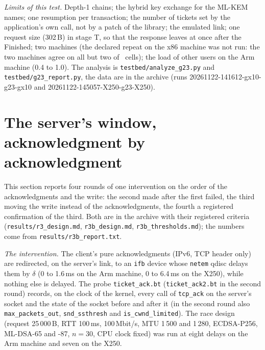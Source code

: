 \documentclass[9pt]{article}
\begin{document}
\emph{Limits of this test.} Depth-1 chains; the hybrid key exchange for the ML-KEM names; one resumption per transaction; the number of tickets set by the application's own call, not by a patch of the library; the emulated link; one request size (302\,B) in stage T, so that the response leaves at once after the Finished; two machines (the declared repeat on the x86 machine was not run: the two machines agree on all but two of \GtlsBothCells\ cells); the load of other users on the Arm machine (0.4 to 1.0). The analysis is \texttt{testbed/analyze\_g23.py} and \texttt{testbed/g23\_report.py}, the data are in the archive (runs 20261122-141612-gx10-g23-gx10 and 20261122-145057-X250-g23-X250).

\section*{The server's window, acknowledgment by acknowledgment}
This section reports four rounds of one intervention on the order of the acknowledgments and the write: the second made after the first failed, the third moving the write instead of the acknowledgments, the fourth a registered confirmation of the third. Both are in the archive with their registered criteria (\texttt{results/r3\_design.md}, \texttt{r3b\_design.md}, \texttt{r3b\_thresholds.md}); the numbers come from \texttt{results/r3b\_report.txt}.

\emph{The intervention.} The client's pure acknowledgments (IPv6, TCP header only) are redirected, on the server's link, to an \texttt{ifb} device whose \texttt{netem} qdisc delays them by $\delta$ (0 to 1.6\,ms on the Arm machine, 0 to 6.4\,ms on the X250), while nothing else is delayed. The probe \texttt{ticket\_ack.bt} (\texttt{ticket\_ack2.bt} in the second round) records, on the clock of the kernel, every call of \texttt{tcp\_ack} on the server's socket and the state of the socket before and after it (in the second round also \texttt{max\_packets\_out}, \texttt{snd\_ssthresh} and \texttt{is\_cwnd\_limited}). The race design (request 25\,000\,B, RTT 100\,ms, 100\,Mbit/s, MTU 1\,500 and 1\,280, ECDSA-P256, ML-DSA-65 and -87, $n=30$, CPU clock fixed) was run at eight delays on the Arm machine and seven on the X250.
\end{document}
